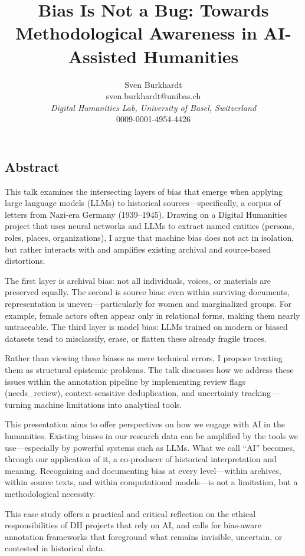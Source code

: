 \documentclass[11pt
]{article}
\title{Bias Is Not a Bug: Towards Methodological Awareness in AI-Assisted Humanities}
\author{Sven Burkhardt \\
\small{sven.burkhardt@unibas.ch}\\
\small\emph{Digital Humanities Lab, University of Basel, Switzerland} \\
\footnotesize\orcidlink{0009-0001-4954-4426} {0009-0001-4954-4426}
}
\date{\vspace{-3ex}}
\begin{document}
\maketitle
\subsection{Abstract}
This talk examines the intersecting layers of bias that emerge when applying large language models (LLMs) to historical sources—specifically, a corpus of letters from Nazi-era Germany (1939–1945). Drawing on a Digital Humanities project that uses neural networks and LLMs to extract named entities (persons, roles, places, organizations), I argue that machine bias does not act in isolation, but rather interacts with and amplifies existing archival and source-based distortions.

The first layer is archival bias: not all individuals, voices, or materials are preserved equally. The second is source bias: even within surviving documents, representation is uneven—particularly for women and marginalized groups. For example, female actors often appear only in relational forms, making them nearly untraceable. The third layer is model bias: LLMs trained on modern or biased datasets tend to misclassify, erase, or flatten these already fragile traces.

Rather than viewing these biases as mere technical errors, I propose treating them as structural epistemic problems. The talk discusses how we address these issues within the annotation pipeline by implementing review flags (needs\_review), context-sensitive deduplication, and uncertainty tracking—turning machine limitations into analytical tools.

This presentation aims to offer perspectives on how we engage with AI in the humanities. Existing biases in our research data can be amplified by the tools we use—especially by powerful systems such as LLMs. What we call “AI” becomes, through our application of it, a co-producer of historical interpretation and meaning. Recognizing and documenting bias at every level—within archives, within source texts, and within computational models—is not a limitation, but a methodological necessity.

This case study offers a practical and critical reflection on the ethical responsibilities of DH projects that rely on AI, and calls for bias-aware annotation frameworks that foreground what remains invisible, uncertain, or contested in historical data.
\end{document}

